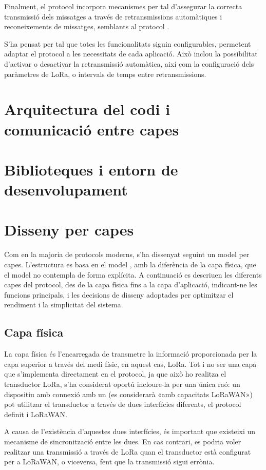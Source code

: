 \documentclass{tfgitic}[2024/07/01]
\begin{document}
Finalment, el protocol incorpora mecanismes per tal d'assegurar la correcta transmissió dels missatges a través de retransmissions automàtiques i reconeixements de missatges, semblants al protocol .

S'ha pensat per tal que totes les funcionalitats siguin configurables, permetent adaptar el protocol a les necessitats de cada aplicació. Això inclou la possibilitat d'activar o desactivar la retransmissió automàtica, així com la configuració dels paràmetres de LoRa, o intervals de temps entre retransmissions.

\section{Arquitectura del codi i comunicació entre capes}
\section{Biblioteques i entorn de desenvolupament}

\section{Disseny per capes}
Com en la majoria de protocols moderns, s'ha dissenyat seguint un model per capes. L'estructura es basa en el model , amb la diferència de la capa física, que el model  no contempla de forma explícita. 
A continuació es descriuen les diferents capes del protocol, des de la capa física fins a la capa d’aplicació, indicant-ne les funcions principals, i les decisions de disseny adoptades per optimitzar el rendiment i la simplicitat del sistema.

\subsection{Capa física}
La capa física és l'encarregada de transmetre la informació proporcionada per la capa superior a través del medi físic, en aquest cas, LoRa. Tot i no ser una capa que s'implementa directament en el protocol, ja que això ho realitza el transductor LoRa, s'ha considerat oportú incloure-la per una única raó: un dispositiu amb connexió amb un  (es considerarà «amb capacitats LoRaWAN») pot utilitzar el transductor a través de dues interfícies diferents, el protocol definit i LoRaWAN.

A causa de l'existència d'aquestes dues interfícies, és important que existeixi un mecanisme de sincronització entre les dues. En cas contrari, es podria voler realitzar una transmissió a través de LoRa quan el transductor està configurat per a LoRaWAN, o viceversa, fent que la transmissió sigui errònia.
\end{document}
